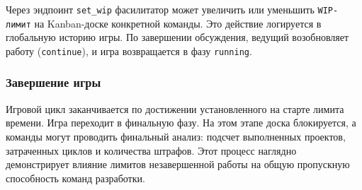 Через эндпоинт \texttt{set\_wip} фасилитатор может увеличить или уменьшить \texttt{WIP-лимит} на Kanban-доске конкретной команды. Это действие логируется в глобальную историю игры. По завершении обсуждения, ведущий возобновляет работу (\texttt{continue}), и игра возвращается в фазу \texttt{running}.

\subsubsection{Завершение игры}

Игровой цикл заканчивается по достижении установленного на старте лимита времени. Игра переходит в финальную фазу. На этом этапе доска блокируется, а команды могут проводить финальный анализ: подсчет выполненных проектов, затраченных циклов и количества штрафов. Этот процесс наглядно демонстрирует влияние лимитов незавершенной работы на общую пропускную способность команд разработки.
